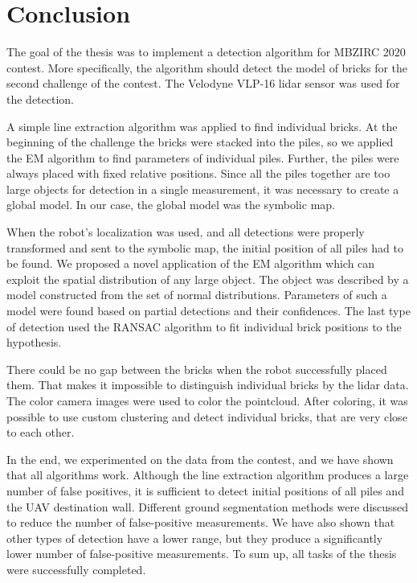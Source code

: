 \chapter{Conclusion}
\label{ch:conclusion}
The goal of the thesis was to implement a detection algorithm for MBZIRC 2020 contest. More specifically, the algorithm should detect the model of bricks for the second challenge of the contest. The Velodyne VLP-16 lidar sensor was used for the detection. 

A simple line extraction algorithm was applied to find individual bricks. At the beginning of the challenge the bricks were stacked into the piles, so we applied the EM algorithm to find parameters of individual piles. Further, the piles were always placed with fixed relative positions. Since all the piles together are too large objects for detection in a single measurement, it was necessary to create a global model. In our case, the global model was the symbolic map.

When the robot's localization was used, and all detections were properly transformed and sent to the symbolic map, the initial position of all piles had to be found. We proposed a novel application of the EM algorithm which can exploit the spatial distribution of any large object. The object was described by a model constructed from the set of normal distributions. Parameters of such a model were found based on partial detections and their confidences. The last type of detection used the RANSAC algorithm to fit individual brick positions to the hypothesis.

There could be no gap between the bricks when the robot successfully placed them. That makes it impossible to distinguish individual bricks by the lidar data. The color camera images were used to color the pointcloud. After coloring, it was possible to use custom clustering and detect individual bricks, that are very close to each other.

In the end, we experimented on the data from the contest, and we have shown that all algorithms work. Although the line extraction algorithm produces a large number of false positives, it is sufficient to detect initial positions of all piles and the UAV destination wall. Different ground segmentation methods were discussed to reduce the number of false-positive measurements. We have also shown that other types of detection have a lower range, but they produce a significantly lower number of false-positive measurements. To sum up, all tasks of the thesis were successfully completed.